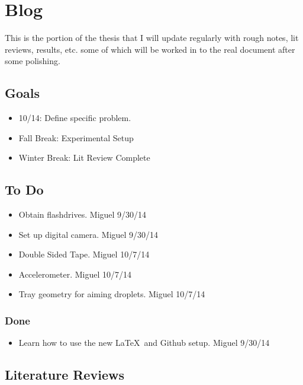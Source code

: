 \chapter*{Blog}
	
	This is the portion of the thesis that I will update regularly with rough notes, lit reviews, results, etc. some of which will be worked in to the real document after some polishing. 
	\section{Goals}
	\begin{itemize}
	\item{10/14: Define specific problem.}
	\item{Fall Break: Experimental Setup}
	\item{Winter Break: Lit Review Complete}

	\end{itemize}

	
	
	\section{To Do}
	\begin{itemize}
	\item{Obtain flashdrives.    Miguel 9/30/14}
	\item{Set up digital camera.    Miguel 9/30/14}
	\item{Double Sided Tape.    Miguel 10/7/14}
	\item{Accelerometer.    Miguel 10/7/14}
	\item{Tray geometry for aiming droplets.    Miguel 10/7/14}
	\end{itemize}
	
	\subsection{Done}
	\begin{itemize}
	\item{Learn how to use the new \LaTeX\ and Github setup.     Miguel 9/30/14}
	\end{itemize}
	
	\section{Literature Reviews}
	
